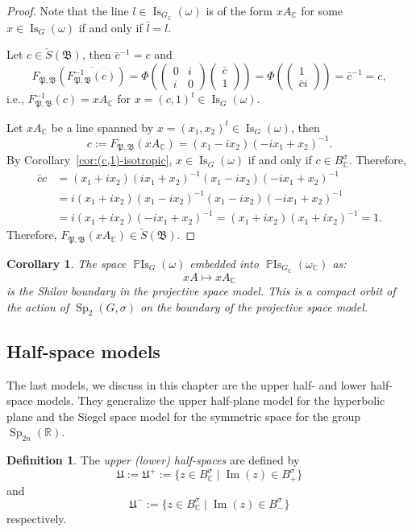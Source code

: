 \documentclass[a4paper,oneside,11pt]{amsart}
\DeclareMathOperator{\Sp}{Sp}
\DeclareMathOperator{\Imm}{Im}
\DeclareMathOperator{\Is}{Is}
\DeclareMathOperator{\PIs}{\mathbb{P}Is}
\newcommand{\R}{\mathbb R}
\newcommand{\CC}{\mathbb C}
\newcommand{\Clm}[2]
{\begin{pmatrix}
#1\\
#2
\end{pmatrix}}
\theoremstyle{plain}
\newtheorem{cor}[teo]{Corollary}
\theoremstyle{definition}
\newtheorem{df}[teo]{Definition}
\theoremstyle{remark}
\newcommand{\defin}{\emph}
\begin{document}
\begin{proof}
Note that the line $l\in \Is_{G_\CC}(\omega)$ is of the form $xA_\CC$ for some $x\in\Is_G(\omega)$ if and only if $\bar l =l$.

Let $c\in \check{S}(\mathfrak B)$, then $\bar c^{-1}=c$ and
$$F_{\mathfrak P,\mathfrak B}\left(\overline{F_{\mathfrak P,\mathfrak B}^{-1}(c)}\right)=\Phi\left(\!\!\begin{pmatrix}0 & i\\ i & 0\end{pmatrix}\Clm{\bar c}{1}\!\!\right)=\Phi\left(\!\!\Clm{1}{\bar ci}\!\!\right)=\bar c^{-1}=c,$$
i.e., $F_{\mathfrak P,\mathfrak B}^{-1}(c)=xA_\mathbb C$ for $x=(c,1)^t\in\Is_G(\omega)$.

Let $xA_\CC$ be a line spanned by $x=(x_1,x_2)^t\in\Is_G(\omega)$, then
$$c:=F_{\mathfrak P,\mathfrak B}(xA_\CC)=(x_1-ix_2)(-ix_1+x_2)^{-1}.$$
By Corollary~\ref{cor:(c,1)-isotropic}, $x\in\Is_G(\omega)$ if and only if $c\in B^\sigma_\CC$. Therefore,
\begin{align*}
    \bar c c&=(x_1+ix_2)(ix_1+x_2)^{-1}(x_1-ix_2)(-ix_1+x_2)^{-1}\\
    &=i(x_1+ix_2)(x_1-ix_2)^{-1}(x_1-ix_2)(-ix_1+x_2)^{-1}\\
    &=i(x_1+ix_2)(-ix_1+x_2)^{-1}=(x_1+ix_2)(x_1+ix_2)^{-1}=1.    
\end{align*}
Therefore, $F_{\mathfrak P,\mathfrak B}(xA_\mathbb C)\in \check{S}(\mathfrak B)$.
\end{proof}

\begin{cor}
The space $\PIs_{G}(\omega)$ embedded into $\PIs_{G_\CC}(\omega_\mathbb C)$ as:
$$xA \mapsto xA_\CC$$
is the Shilov boundary in the projective space model. This is a  compact orbit of the action of $\Sp_2(G,\sigma)$ on the boundary of the projective space model.
\end{cor}


\subsection{Half-space models}

The last models, we discuss in this chapter are the upper half- and lower half-space models. They generalize the upper half-plane model for the hyperbolic plane and the Siegel space model for the symmetric space for the group $\Sp_{2n}(\R)$.

\begin{df}
The \defin{upper (lower) half-spaces} are defined by
$$\mathfrak U:=\mathfrak U^+:=\{z\in B_\CC^{\sigma}\mid \Imm(z)\in B^{\sigma}_+\}$$
and
$$\mathfrak U^-:=\{z\in B_\CC^{\sigma}\mid \Imm(z)\in B^{\sigma}_-\}$$
respectively.
\end{df}
\end{document}
